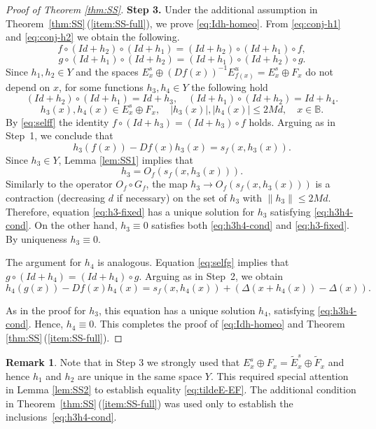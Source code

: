 \documentclass[12pt]{article}
\newcommand{\Bb}{\mathbb{B}}
\theoremstyle{definition}
\newtheorem{remark}[thm]{Remark}
\begin{document}
\begin{proof}[Proof of Theorem \ref{thm:SS}]
\textbf{Step 3.} Under the additional assumption in Theorem~\ref{thm:SS}\,(\ref{item:SS-full}), we prove \eqref{eq:Idh-homeo}.
From \eqref{eq:conj-h1} and \eqref{eq:conj-h2} we obtain the following.
\begin{equation}\label{eq:selff}
f \circ (Id+h_2) \circ (Id+h_1) = (Id+h_2) \circ (Id+h_1) \circ f,   
\end{equation}
\begin{equation}\label{eq:selfg}
g \circ (Id+h_1) \circ (Id+h_2) = (Id+h_1) \circ (Id+h_2) \circ g.
\end{equation}
Since $h_1, h_2 \in Y$ and the spaces $E^s_x \oplus (Df(x))^{-1}E^u_{f(x)} = E^s_x \oplus F_x$ do not depend on $x$, for some functions $h_3, h_4 \in Y$ the following hold
$$
(Id+h_2) \circ (Id+h_1) = Id + h_3, \quad  (Id+h_1) \circ (Id+h_2) = Id + h_4. 
$$
\begin{equation}\label{eq:h3h4-cond}
h_3(x), h_4(x) \in E^s_x \oplus F_x, \quad |h_3(x)|, |h_4(x)| \leq 2Md, \quad x \in \Bb.
\end{equation}
By \eqref{eq:selff} the identity   
$
f\circ (Id+h_3) = (Id+h_3) \circ f
$ holds.
Arguing as in Step~1, we conclude that
$$
h_3(f(x)) - Df(x)h_3(x) = s_f(x, h_3(x)).
$$
Since $h_3 \in Y$, Lemma \ref{lem:SS1} implies that 
\begin{equation}\label{eq:h3-fixed}
h_3 = O_f(s_f(x, h_3(x))).
\end{equation}
Similarly to the operator $O_f \circ G_f$, the map $h_3 \to O_f(s_f(x, h_3(x)))$ is a contraction (decreasing $d$ if necessary) on the set of $h_3$ with $\|h_3\| \leq 2Md$. Therefore, equation \eqref{eq:h3-fixed} has a unique solution for $h_3$ satisfying \eqref{eq:h3h4-cond}. On the other hand, $h_3 \equiv 0$ satisfies both \eqref{eq:h3h4-cond} and \eqref{eq:h3-fixed}. By uniqueness $h_3 \equiv 0$.

The argument for $h_4$ is analogous. Equation \eqref{eq:selfg} implies that $g \circ (Id+h_4) = (Id+h_4) \circ g$.
Arguing as in Step~2, we obtain
$$
h_4(g(x)) - Df(x)h_4(x) = s_f(x, h_4(x)) + \left( \Delta(x+h_4(x)) - \Delta(x) \right).
$$

As in the proof for $h_3$, this equation has a unique solution $h_4$, satisfying \eqref{eq:h3h4-cond}. Hence, $h_4 \equiv 0$. This completes the proof of \eqref{eq:Idh-homeo} and Theorem \ref{thm:SS}\,(\ref{item:SS-full}).
\end{proof}
\begin{remark}
Note that in Step 3 we strongly used that $E^s_x\oplus F_x = \tilde{E}^s_x\oplus \tilde{F}_x$ and hence $h_1$ and $h_2$ are unique in the same space $Y$.  This required special attention in Lemma \ref{lem:SS2} to establish equality \eqref{eq:tildeE-EF}. The additional condition in Theorem~\ref{thm:SS}\,(\ref{item:SS-full}) was used only to establish the inclusions~\eqref{eq:h3h4-cond}.
\end{remark}
\end{document}
